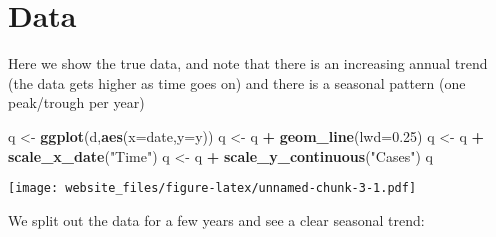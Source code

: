 \documentclass[]{book}
\newenvironment{Shaded}{\begin{snugshade}}{\end{snugshade}}
\newcommand{\KeywordTok}[1]{\textcolor[rgb]{0.13,0.29,0.53}{\textbf{#1}}}
\newcommand{\DataTypeTok}[1]{\textcolor[rgb]{0.13,0.29,0.53}{#1}}
\newcommand{\DecValTok}[1]{\textcolor[rgb]{0.00,0.00,0.81}{#1}}
\newcommand{\FloatTok}[1]{\textcolor[rgb]{0.00,0.00,0.81}{#1}}
\newcommand{\StringTok}[1]{\textcolor[rgb]{0.31,0.60,0.02}{#1}}
\newcommand{\OperatorTok}[1]{\textcolor[rgb]{0.81,0.36,0.00}{\textbf{#1}}}
\newcommand{\NormalTok}[1]{#1}
\begin{document}
\section{Data}\label{data}

Here we show the true data, and note that there is an increasing annual
trend (the data gets higher as time goes on) and there is a seasonal
pattern (one peak/trough per year)

\begin{Shaded}
\begin{Highlighting}[]
\NormalTok{q <-}\StringTok{ }\KeywordTok{ggplot}\NormalTok{(d,}\KeywordTok{aes}\NormalTok{(}\DataTypeTok{x=}\NormalTok{date,}\DataTypeTok{y=}\NormalTok{y))}
\NormalTok{q <-}\StringTok{ }\NormalTok{q }\OperatorTok{+}\StringTok{ }\KeywordTok{geom_line}\NormalTok{(}\DataTypeTok{lwd=}\FloatTok{0.25}\NormalTok{)}
\NormalTok{q <-}\StringTok{ }\NormalTok{q }\OperatorTok{+}\StringTok{ }\KeywordTok{scale_x_date}\NormalTok{(}\StringTok{"Time"}\NormalTok{)}
\NormalTok{q <-}\StringTok{ }\NormalTok{q }\OperatorTok{+}\StringTok{ }\KeywordTok{scale_y_continuous}\NormalTok{(}\StringTok{"Cases"}\NormalTok{)}
\NormalTok{q}
\end{Highlighting}
\end{Shaded}

\texttt{[image: website\_files/figure-latex/unnamed-chunk-3-1.pdf]}

We split out the data for a few years and see a clear seasonal trend:

\begin{Shaded}
\end{Shaded}
\end{document}
